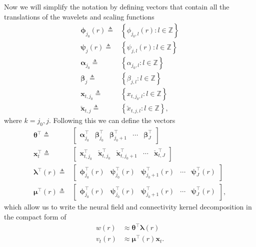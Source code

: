 \documentclass[review,authoryear,3p]{elsarticle}
\begin{document}
Now we will simplify the notation by defining vectors that contain all the translations of the wavelets and scaling functions 
\begin{align}      
	\boldsymbol\phi_{j_0}(r) \triangleq&\left\lbrace{\phi_{j_0,l}(r)}:l \in \mathbb{Z} \right\rbrace \\
	\boldsymbol\psi_{j}(r) \triangleq& \left\lbrace{\psi_{j,l}(r)}:l \in \mathbb{Z} \right\rbrace\\
	\boldsymbol\alpha_{j_0} \triangleq& \left\lbrace\alpha_{j_0, l}:l \in \mathbb{Z} \right\rbrace \\
	\boldsymbol\beta_{j} \triangleq& \left\lbrace\beta_{j, l}:l \in \mathbb{Z} \right\rbrace \\
	\mathbf{x}_{t,j_0} \triangleq& \left\lbrace{x}_{t,j_{0},l}:l \in \mathbb{Z} \right\rbrace \\
	\check{\mathbf{x}}_{t,j} \triangleq& \left\lbrace{\check{x}}_{t,j,l}:l \in \mathbb{Z} \right\rbrace,
\end{align}
where $k = j_0,j$. Following this we can define the vectors 
\begin{align}
\boldsymbol\theta^\top \triangleq& [\begin{array}{ccccc} \boldsymbol\alpha_{j_0}^\top & \boldsymbol\beta_{j_0}^\top & \boldsymbol\beta_{j_0+1}^\top & \cdots & \boldsymbol\beta_{J}^\top \end{array}] 
\label{KernelWeights} \\
\mathbf{x}_{t}^\top \triangleq& [\begin{array}{ccccc}\mathbf{x}_{t,j_{0}}^\top &  \check{\mathbf{x}}_{t,j_{0}}^\top & \check{\mathbf{x}}_{t,j_{0}+1}^\top & \cdots & \check{\mathbf{x}}_{t,J}^\top\end{array}]
\label{FieldWeights} \\
\label{KernelBasisVector}
\boldsymbol\lambda^\top(r) \triangleq& \left[
\begin{array}{ccccc} \boldsymbol\phi_{j_0}^\top(r) &
\boldsymbol\psi_{j_0}^\top(r) & 
\boldsymbol\psi_{j_0+1}^\top(r) &
\cdots &
\boldsymbol\psi_{J}^\top(r)\end{array}\right] \\
\label{FieldBasisVector}
\boldsymbol\mu^\top (r) \triangleq& \left[
\begin{array}{ccccc}\boldsymbol\phi_{j_0}^\top(r) &
\boldsymbol\psi_{j_0}^\top(r) & 
\boldsymbol\psi_{j_0+1}^\top(r) &
\cdots &
\boldsymbol\psi_{J}^\top(r)\end{array}\right],
\end{align}
which allow us to write the neural field and connectivity kernel decomposition in the compact form of
\begin{align}
	w\left(r\right) &\approx \boldsymbol\theta^\top\boldsymbol\lambda\left(r\right) 
	\label{eq:KernelFiniteExpansion} \\
	v_t\left(r\right) &\approx \boldsymbol\mu^\top\left(r\right)\mathbf{x}_t.
	\label{eq:FieldFiniteExpansion}
\end{align}
\end{document}
